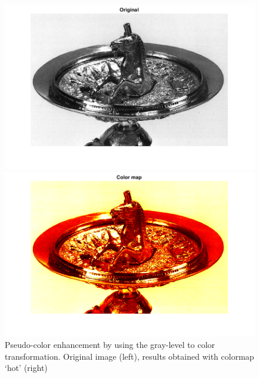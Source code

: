 \documentclass[conference]{IEEEtran}
\begin{document}
\begin{figure}[ht]
\begin{multicols}{2}
    \includegraphics[width=1.1\linewidth]{colmap21.png}\par 
    \includegraphics[width=1.1\linewidth]{colmap22.png}\par 
    \end{multicols}
\caption{Pseudo-color enhancement by using the gray-level to color transformation. Original image (left), results obtained with colormap `hot' (right)}
\label{colmap_2}
\end{figure}
\end{document}
